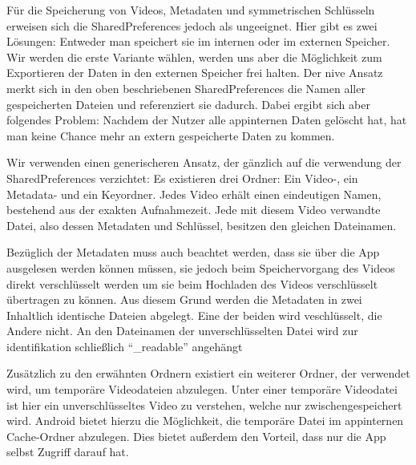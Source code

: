Für die Speicherung von Videos, Metadaten und symmetrischen Schlüsseln erweisen sich die SharedPreferences jedoch als ungeeignet. Hier gibt es zwei Lösungen: Entweder man speichert sie im internen oder im externen Speicher. Wir werden die erste Variante wählen, werden uns aber die Möglichkeit zum Exportieren der Daten in den externen Speicher frei halten. Der nive Ansatz merkt sich in den oben beschriebenen SharedPreferences die Namen aller gespeicherten Dateien und referenziert sie dadurch. Dabei ergibt sich aber folgendes Problem: Nachdem der Nutzer alle appinternen Daten gelöscht hat, hat man keine Chance mehr an extern gespeicherte Daten zu kommen. \newline\par
Wir verwenden einen generischeren Ansatz, der gänzlich auf die verwendung der SharedPreferences verzichtet: Es existieren drei Ordner: Ein Video-, ein Metadata- und ein Keyordner. Jedes Video erhält einen eindeutigen Namen, bestehend aus der exakten Aufnahmezeit. Jede mit diesem Video verwandte Datei, also dessen Metadaten und Schlüssel, besitzen den gleichen Dateinamen.\newline\par

Bezüglich der Metadaten muss auch beachtet werden, dass sie über die App ausgelesen werden können müssen, sie jedoch beim Speichervorgang des Videos direkt verschlüsselt werden um sie beim Hochladen des Videos verschlüsselt übertragen zu können. Aus diesem Grund werden die Metadaten in zwei Inhaltlich identische Dateien abgelegt. Eine der beiden wird veschlüsselt, die Andere nicht. An den Dateinamen der unverschlüsselten Datei wird zur identifikation schließlich ``\_readable'' angehängt\newline\par

Zusätzlich zu den erwähnten Ordnern existiert ein weiterer Ordner, der verwendet wird, um temporäre Videodateien abzulegen. Unter einer temporäre Videodatei ist hier ein unverschlüsseltes Video zu verstehen, welche nur zwischengespeichert wird. Android bietet hierzu die Möglichkeit, die temporäre Datei im appinternen Cache-Ordner abzulegen. Dies bietet außerdem den Vorteil, dass nur die App selbst Zugriff darauf hat.

